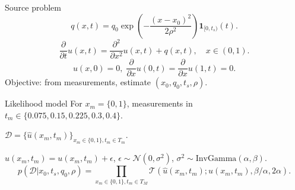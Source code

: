 \documentclass{beamer}
\begin{document}
\begin{frame}
\begin{figure}
\centering
\captionsetup[subfigure]{labelformat=empty}
\end{figure}
\end{frame}
\begin{frame}
\begin{block}{Source problem}
\begin{equation*}
q(x,t) = q_0 \exp \left(-\frac{(x-x_0)^2}{2 \rho^2} \right) \mathbf{1}_{[0,t_s)}(t).
\end{equation*}
\begin{equation*}
\frac{\partial}{\partial t} u(x,t) = \frac{\partial^2}{\partial x^2} u(x,t) + q(x,t), \quad x \in (0,1).
\end{equation*}
\begin{equation*}
u(x,0) = 0, \; \frac{\partial}{\partial x} u(0,t) = \frac{\partial}{\partial x} u(1,t) = 0.
\end{equation*}
Objective: from measurements, estimate $(x_0,q_0,t_s,\rho)$.
\end{block}
\begin{block}{Likelihood model}
For $x_m=\{0,1\}$, measurements in $t_m \in \{0.075,0.15,0.225,0.3,0.4\}$.

$\mathcal{D} = \{\hat{u}(x_m,t_m)\}_{x_m \in \{0,1\},t_m \in T_m}$.

$\hat{u}(x_m,t_m) = u(x_m,t_m) + \epsilon$, $\epsilon \sim \mathcal{N}(0,\sigma^2)$, $\sigma^2 \sim \text{InvGamma}(\alpha,\beta)$.
\begin{equation*}
p(\mathcal{D}|x_0,t_s,q_0,\rho) = \prod_{x_m \in \{0,1\},t_m \in T_M} \mathcal{T}(\hat{u}(x_m,t_m);u(x_m,t_m),\beta/\alpha,2 \alpha).
\end{equation*}
\end{block}
\end{frame}
\end{document}
